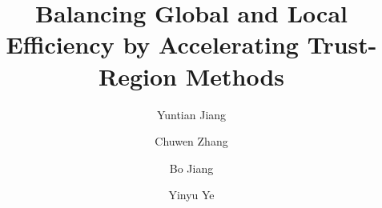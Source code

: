 \documentclass{mcom-l}
\numberwithin{equation}{section}
\begin{document}
\title[Accelerating Trust-Region Methods]{Balancing Global and Local Efficiency by Accelerating Trust-Region Methods}


\author{Yuntian Jiang}
\address{School of Information Management and Engineering, Shanghai University of Finance and Economics, Shanghai 200433, China}

\author{Chuwen Zhang}
\address{Booth School of Business, University of Chicago, Chicago 60637, USA}

\author{Bo Jiang}
\address{School of Information Management and Engineering, Shanghai University of Finance and Economics, Shanghai 200433, China}

\author{Yinyu Ye}
\address{Antai College of Economics and Management, Shanghai Jiao Tong University, Shanghai 200030, China}




\end{document}
